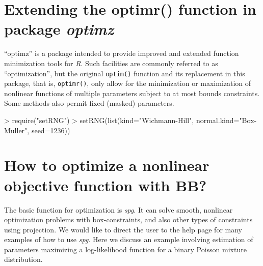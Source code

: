 \documentclass[10pt]{article}
\begin{document}


\section{Extending the optimr() function in package \emph{optimz}}
``optimz'' is a package intended to provide improved and extended 
function minimization tools for \emph{R}. Such facilities are
commonly referred to as ``optimization'', but the original \texttt{optim()}
function and its replacement in this package, that is, \texttt{optimr()},
only allow for the minimization or maximization of nonlinear functions of
multiple parameters subject to at most bounds constraints. Some methods
also permit fixed (masked) parameters.

\begin{Schunk}
\begin{Sinput}
> require("setRNG") 
> setRNG(list(kind="Wichmann-Hill", normal.kind="Box-Muller", seed=1236))
\end{Sinput}
\end{Schunk}


\section{How to optimize a nonlinear objective function with BB?}
The basic function for optimization is \emph{spg}.  It can solve smooth, 
nonlinear optimization problems with box-constraints, and also other types of 
constraints using projection.  
We would like to direct the user to the help page for many examples of 
how to use \emph{spg}.  Here we discuss an example involving estimation of 
parameters maximizing a log-likelihood function for 
a binary Poisson mixture distribution.  
\end{document}
